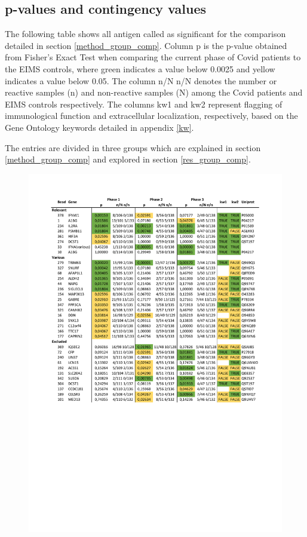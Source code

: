 \documentclass{article}
\begin{document}
\subsection{p-values and contingency values}
The following table shows all antigen called as significant for the comparison detailed in section \ref{method_group_comp}. Column p is the p-value obtained from Fisher's Exact Test when comparing the current phase of Covid patients to the EIMS controls, where green indicates a value below 0.0025 and yellow indicates a value below 0.05. The column n/N n/N denotes the number or reactive samples (n) and non-reactive samples (N) among the Covid patients and EIMS controls respectively. The columns kw1 and kw2 represent flagging of immunological function and extracellular localization, respectively, based on the Gene Ontology keywords detailed in appendix \ref{kw}.

The entries are divided in three groups which are explained in section \ref{method_group_comp} and explored in section \ref{res_group_comp}.

\begin{figure}[H]
	\centering
	\includegraphics[clip, trim=1.8cm 10.5cm 1.8cm 2cm, width=\linewidth]{pages/sba_sig.pdf}
\end{figure}
\end{document}
